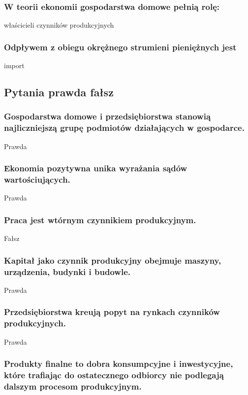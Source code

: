 \documentclass[a4paper,12pt]{article}
\begin{document}
\subsubsection{W teorii ekonomii gospodarstwa domowe pełnią rolę:}

właścicieli czynników produkcyjnych

\subsubsection{Odpływem z obiegu okrężnego strumieni pieniężnych jest}

import

\subsection{Pytania prawda fałsz}

\subsubsection{Gospodarstwa domowe i przedsiębiorstwa stanowią najliczniejszą grupę podmiotów działających w gospodarce.}
Prawda

\subsubsection{Ekonomia pozytywna unika wyrażania sądów wartościujących.}

Prawda

\subsubsection{Praca jest wtórnym czynnikiem produkcyjnym.}

Fałsz

\subsubsection{Kapitał jako czynnik produkcyjny obejmuje maszyny, urządzenia, budynki i budowle.}

Prawda

\subsubsection{Przedsiębiorstwa kreują popyt na rynkach czynników produkcyjnych.}

Prawda

\subsubsection{Produkty finalne to dobra konsumpcyjne i inwestycyjne, które trafiając do ostatecznego odbiorcy nie podlegają dalszym procesom produkcyjnym.}
\end{document}
